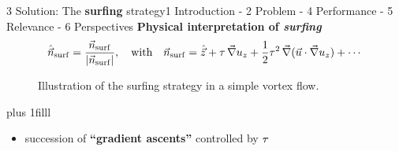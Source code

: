 
\begin{frame}[noframenumbering]{3 Solution: The \textbf{surfing} strategy}{1 Introduction - 2 Problem - 4 Performance - 5 Relevance - 6 Perspectives}
	\centering
	\textbf{\Large Physical interpretation of \textit{surfing}}
	\begin{equation*}
		\hat{\vec{n}}_{\mathrm{surf}} = \frac{\vec{n}_{\mathrm{surf}}}{\lvert\vec{n}_{\mathrm{surf}}\rvert}, \quad \text{with} \quad
		\vec{n}_{\mathrm{surf}} = \hat{\vec{z}} + \tau \, \vec{\nabla} u_z + \frac{1}{2} \tau^2 \, \vec{\nabla} ( \vec{u} \cdot \vec{\nabla} u_z ) + \dotsb
	\end{equation*}

	\begin{figure}
		\captionsetup{skip=10pt}
		\caption{
			Illustration of the surfing strategy in a simple vortex flow.
		}
	\end{figure}

	\vskip0pt plus 1filll

	\large
	\begin{itemize}
		\item<1-> succession of \textbf{``gradient ascents''} controlled by $\tau$
	\end{itemize}
	\vspace{15pt}
\end{frame}

